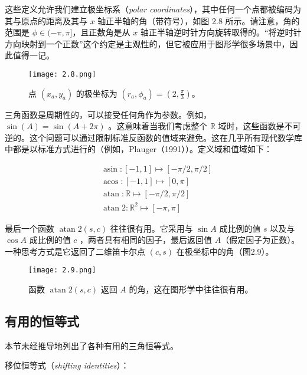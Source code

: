 \documentclass[lang=cn,12pt]{elegantbook}
\begin{document}
这些定义允许我们建立极坐标系（\textit{polar coordinates}），其中任何一个点都被编码为其与原点的距离及其与 $x$ 轴正半轴的角（带符号），如图 2.8 所示。请注意，角的范围是 $\phi\in(-\pi,\pi]$，且正数角是从 $x$ 轴正半轴逆时针方向旋转取得的。“将逆时针方向映射到一个正数”这个约定是主观性的，但它被应用于图形学很多场景中，因此值得一记。

\begin{figure}[htbp]
  \centering
  \texttt{[image: 2.8.png]}
  \caption{点 $(x_a,y_a)$ 的极坐标为 $(r_a,\phi_a)=(2,\frac{\pi}{3})$。}
\end{figure}

三角函数是周期性的，可以接受任何角作为参数。例如，$\sin(A) = \sin(A + 2\pi)$ 。这意味着当我们考虑整个 $\mathbb{R}$ 域时，这些函数是不可逆的。这个问题可以通过限制标准反函数的值域来避免。这在几乎所有现代数学库中都是以标准方式进行的（例如，Plauger（1991））。定义域和值域如下：

\begin{equation}
  \begin{aligned}
     & \operatorname{asin}:[-1,1] \mapsto[-\pi / 2, \pi / 2]      \\
     & \operatorname{acos}:[-1,1] \mapsto[0, \pi]                 \\
     & \operatorname{atan}: \mathbb{R} \mapsto[-\pi / 2, \pi / 2] \\
     & \operatorname{atan} 2: \mathbb{R}^{2} \mapsto[-\pi, \pi]
  \end{aligned}
\end{equation}

最后一个函数 $\operatorname{atan}2(s,c)$ 往往很有用。它采用与 $\sin A$ 成比例的值 $s$ 以及与 $\cos A$ 成比例的值 $c$ ，两者具有相同的因子，最后返回值 $A$（假定因子为正数）。一种思考方式是它返回了二维笛卡尔点 $(c,s)$ 在极坐标中的角（图2.9）。

\begin{figure}[htbp]
  \centering
  \texttt{[image: 2.9.png]}
  \caption{函数 $\operatorname{atan}2(s,c)$ 返回 $A$ 的角，这在图形学中往往很有用。}
\end{figure}

\subsection{有用的恒等式}

本节未经推导地列出了各种有用的三角恒等式。

移位恒等式（\textit{shifting identities}）：
\end{document}
